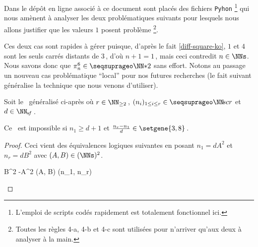 Dans le dépôt en ligne associé à ce document sont placés des fichiers \verb#Pyhon#
\footnote{
	L'emploi de scripts codés rapidement est totalement fonctionnel ici.
}
qui nous amènent à analyser les deux \sftab[x] problématiques suivants pour lesquels nous allons justifier que les valeurs $1$ posent problème
\footnote{
	Toutes les règles 4-a, 4-b et 4-c sont utilisées pour n'arriver qu'aux deux \sftab[x] à analyser à la main.
}.
%
\begin{center}
\end{center}


Ces deux cas sont rapides à gérer puisque, d'après le fait \ref{diff-square-ko}, $1$ et $4$ sont les seuls carrés distants de $3$\,, d'où $n+1 = 1$\,, mais ceci contredit $n \in \NNs$. Nous savons donc que $\consprod<6> \in \NNssquare$ sans effort.
Notons au passage un nouveau cas problématique \enquote{local} pour nos futures recherches (le fait suivant généralise la technique que nous venons d'utiliser).


\begin{fact} \label{sftable-illegal-1-sol}
	Soit le \sftab\ généralisé ci-après où
	$r \in \NN_{\geq 2}$\,,
	$( n_i )_{1 \leq i \leq r} \in \NNseq[r]$
	et
	$d \in \NNsf$\,.

    \begin{center}
    \end{center}

	Ce \sftab\ est impossible si $n_1 \geq d+1$
	et
	$\frac{n_r - n_1}{d} \in \setgene{3, 8}$\,.
\end{fact}


\begin{proof}
	Ceci vient des équivalences logiques suivantes en posant $n_1 = d A^2$ et $n_r = d B^2$ avec $(A, B) \in ( \NNs )^2$.
	
	\medskip
	\begin{stepcalc}[style=ar*, ope={\iff}]
		 \in {}
	\explnext{}
		B^2 -A^2 \in {}
		(A, B) \in {}
	\explnext{}
		(n_1, n_r) \in {}
	\end{stepcalc}

	\vspace{-2ex}	
	\leavevmode
\end{proof}


